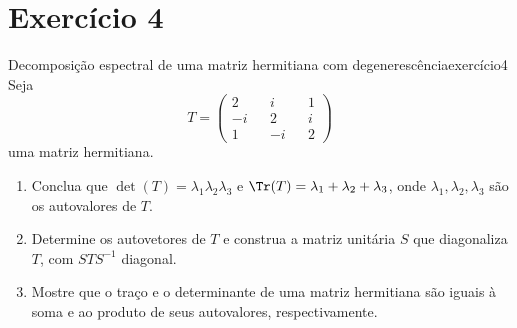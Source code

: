 \section*{Exercício 4}
\begin{exercício}{Decomposição espectral de uma matriz hermitiana com degenerescência}{exercício4}
    Seja
    \begin{equation*}
        T = \begin{pmatrix}
            2 && i && 1\\
            -i&& 2 && i\\
            1 &&-i && 2
        \end{pmatrix}
    \end{equation*}
    uma matriz hermitiana.
    \begin{enumerate}[label=(\alph*)]
        \item Conclua que \(\det(T) = \lambda_1 \lambda_2 \lambda_3\) e \(\Tr(T) = \lambda_1 + \lambda_2 + \lambda_3\), onde \(\lambda_1, \lambda_2, \lambda_3\) são os autovalores de \(T\).
        \item Determine os autovetores de \(T\) e construa a matriz unitária \(S\) que diagonaliza \(T\), com \(S T S^{-1}\) diagonal.
        \item Mostre que o traço e o determinante de uma matriz hermitiana são iguais à soma e ao produto de seus autovalores, respectivamente.
    \end{enumerate}
\end{exercício}
